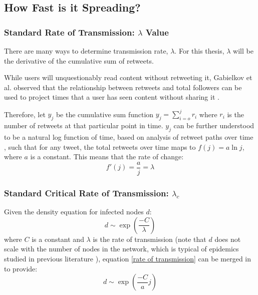 \documentclass[preprint,review,12pt]{elsarticle}
\begin{document}
\subsection{How Fast is it Spreading?}
\subsubsection{Standard Rate of Transmission: $\lambda$ Value}
There are many ways to determine transmission rate, $\lambda$. For this thesis, $\lambda$ will be the derivative of the cumulative sum of retweets. 

While users will unquestionably read content without retweeting it, Gabielkov et al. observed that the relationship between retweets and total followers can be used to project times that a user has seen content without sharing it \cite{gabielkov2016social}.

Therefore, let $y_j$ be the cumulative sum function $y_j = \sum_{i=o}^j r_i$ where $r_i$ is the number of retweets at that particular point in time. $y_j$ can be further understood to be a natural log function of time, based on analysis of retweet paths over time \cite{gabielkov2016social,starbird2014rumors,mention2018twitter}, such that for any tweet, the total retweets over time maps to $f(j) = a \ln j$, where $a$ is a constant. This means that the rate of change:
\begin{equation}
    \label{rate of transmission}
    f'(j) = \frac{a}{j} = \lambda
\end{equation}

\subsubsection{Standard Critical Rate of Transmission: $\lambda_c$}

Given the density equation for infected nodes $d$: \begin{equation}
    \label{densityequation}
    d \sim \exp\left(\frac{ - C}{\lambda}\right)
\end{equation} where $C$ is a constant and $\lambda$ is the rate of transmission \citep{pastor2001epidemic} (note that $d$ does not scale with the number of nodes in the network, which is typical of epidemics studied in previous literature \citep{marro2005nonequilibrium}), equation \ref{rate of transmission}  can be merged in to provide:
\begin{equation}
    d \sim \exp\left(\frac{ - C}{a}j\right)
\end{equation}
\end{document}

